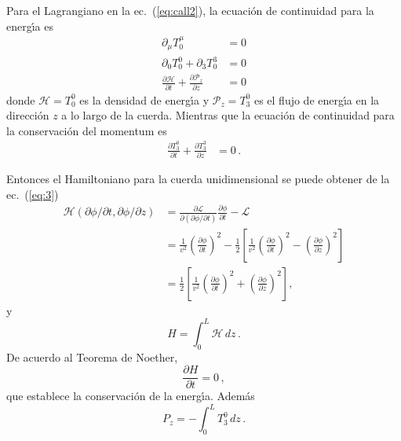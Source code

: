 Para el Lagrangiano en la ec.~(\ref{eq:call2}), la ecuaci\'on de continuidad para la energ\'\i a es
\begin{align}
  \label{eq:239}
  \partial_\mu T^\mu_0&=0\nonumber\\
  \partial_0 T^0_0+\partial_3 T^3_0&=0\nonumber\\
  \frac{\partial\mathcal{H}}{\partial t}+\frac{\partial\mathcal{P}_z}{\partial z}&=0
\end{align}
donde $\mathcal{H}=T^0_0$ es la densidad de energ\'\i a y $\mathcal{P}_z=T^0_3$ es el flujo de energ\'\i a en la direcci\'on $z$ a lo largo de la cuerda. Mientras que la ecuaci\'on de continuidad para la conservaci\'on del momentum es
\begin{align}
   \frac{\partial T^0_3}{\partial t}+\frac{\partial T^3_3}{\partial z}&=0\,.
\end{align}

Entonces el
Hamiltoniano para la cuerda unidimensional se puede obtener de la ec.~(\ref{eq:3})
\begin{align}
  \label{eq:8}
  \mathcal{H}(\partial\phi/\partial t,\partial\phi/\partial z)&=\frac{\partial\mathcal{L}}{\partial(\partial\phi/\partial t)}\frac{\partial\phi}{\partial t}-\mathcal{L}\nonumber\\
  &=\frac{1}{v^2}\left(\frac{\partial\phi}{\partial t}\right)^2-\frac{1}{2}
\left[
  \frac{1}{v^2}\left(\frac{\partial\phi}{\partial t}\right)^2-\left(\frac{\partial\phi}{\partial z}\right)^2
\right]\nonumber\\
  &=\frac{1}{2}
\left[
  \frac{1}{v^2}\left(\frac{\partial\phi}{\partial t}\right)^2+\left(\frac{\partial\phi}{\partial z}\right)^2
\right],
\end{align}
y
\begin{equation}
  \label{eq:142}
  H=\int_{0}^{L}\mathcal{H}\,dz\,.
\end{equation}
De acuerdo al Teorema de Noether,
\begin{equation}
  \frac{\partial H}{\partial t}=0\,,
\end{equation}
que establece la conservaci\'on de la energ\'\i a. Adem\'as
\begin{equation}
  P_z=-\int_{0}^{L}T^0_3\,dz\,.
\end{equation}


